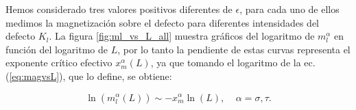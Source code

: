 Hemos considerado tres valores positivos diferentes de $\epsilon$, para cada uno de ellos medimos la magnetizaci\'on sobre el
 defecto para diferentes intensidades del defecto $K_{l}$. La figura \ref{fig:ml_vs_L_all}
 muestra gr\'aficos del logaritmo de $m_{l}^{\alpha}$ en funci\'on del logaritmo de $L$, por lo tanto la pendiente de estas curvas
 representa el exponente crítico efectivo $x_{m}^{\alpha}(L)$, ya que tomando el logaritmo de la ec.(\ref{eq:magvsL}), que lo define, se obtiene:
 
\begin{equation}
	\label{eq:logmagvsL}
	\ln{(m_{l}^{\alpha}(L))} \sim -x_{m}^{\alpha}\ln{(L)}, \; \; \; \; \alpha=\sigma , \tau .
\end{equation}
 
